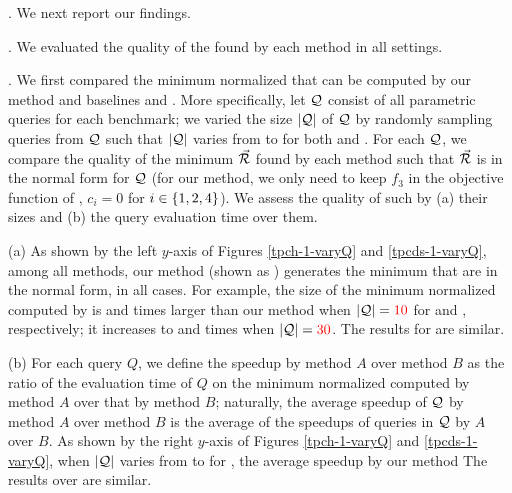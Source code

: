 . We next report our findings.






.
We evaluated the quality of the \bdss found by each method in %
all settings. 


. We first compared the minimum
normalized \bdss that can be computed by our method
and baselines \qcssel and \uscsel.
More specifically, 
let $\mathcal Q$ consist of all parametric queries for each benchmark;
we varied the size $|\mathcal Q|$ of $\mathcal Q$ by randomly sampling queries
from $\mathcal Q$ such that $|\mathcal Q|$ varies from  to  for both \tpch and \tpcds. For each $\mathcal Q$, we compare the quality of
the minimum \bds $\vec{{\mathcal R}}$ found by each method such that
$\vec{{\mathcal R}}$ is in the normal form for $\mathcal Q$ (for our method, we
only need to keep $f_{3}$ in the objective function of \opts,
\ie $c_{i} = 0$ for $i\allowbreak\in\allowbreak \{1,\allowbreak 2,\allowbreak 4\}$).
We assess the quality of such \bdss by (a) their sizes and (b) the
query evaluation time over them.

\sstab (a) As shown by the left $y$-axis of Figures
\ref{tpch-1-varyQ} and \ref{tpcds-1-varyQ}, 
among all methods, our method (shown as \opts)
generates the minimum \bdss that are in the normal
form,
in all cases. For example, the size of the
minimum normalized \bds computed by \warn{\uscsel} is
 and  times larger than our method
when $|\mathcal Q| = {\color{red}{10}}$ for \tpch
and \tpcds, respectively; it increases to  and  times when
$|\mathcal Q| = {\color{red}{30}}$.
The results for \qcssel are similar. %


\sstab (b) For each query $Q$, we define the speedup by method
$A$ over method $B$ as the ratio of the evaluation time of $Q$
on the minimum normalized \bds computed by method $A$ over that
by method $B$; naturally, the average speedup of $\mathcal Q$ by method
$A$ over method $B$ is the average of the speedups of queries in
$\mathcal Q$ by $A$ over $B$.
As shown by the right $y$-axis of Figures \ref{tpch-1-varyQ} and \ref{tpcds-1-varyQ},
when $|\mathcal Q|$ varies from  to  for
\tpcds, the average speedup by our method
The results over \tpch are similar.

